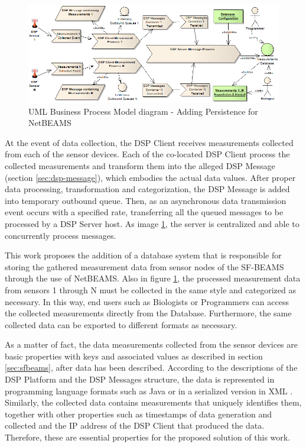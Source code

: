 \begin{figure}[!b]
  \centering
  \includegraphics[scale=0.5]{../diagrams/DSP-DataPersistence-Business-Diagram}
  \caption{UML Business Process Model diagram - Adding Persistence for NetBEAMS}
  \label{fig:dsp-persistence-business-process}
\end{figure}

At the event of data collection, the DSP Client receives measurements collected
from each of the sensor devices. Each of the co-located DSP Client process the
collected measurements and transform them into the alleged DSP Message
(section \ref{sec:dsp-message}), which embodies the actual data values. After
proper data processing, transformation and categorization, the DSP Message is
added into temporary outbound queue. Then, as an asynchronous data transmission
event occurs with a specified rate, transferring all the queued messages to be
processed by a DSP Server host. As image
\ref{fig:dsp-persistence-business-process}, the server is centralized and able
to concurrently process messages.

This work proposes the addition of a database system that is responsible for
storing the gathered measurement data from sensor nodes of the SF-BEAMS through
the use of NetBEAMS. Also in figure \ref{fig:dsp-persistence-business-process},
the processed measurement data from sensors 1 through N must be collected in
the same style and categorized as necessary. In this way, end users such as
Biologists or Programmers can access the collected measurements directly
from the Database. Furthermore, the same collected data can be exported to
different formats as necessary.

As a matter of fact, the data measurements collected from the sensor devices
are basic properties with keys and associated values as described in section 
\ref{sec:sfbeams}, after data has been described. According to the descriptions
of the DSP Platform and the DSP Messages structure, the data is represented in
programming language formats such as Java \cite{java} or in a serialized
version in XML \cite{xml}. Similarly, the collected data contains measurements
that uniquely identifies them, together with other properties such as
timestamps of data generation and collected and the IP address of the DSP
Client that produced the data. Therefore, these are essential properties for
the proposed solution of this work.

